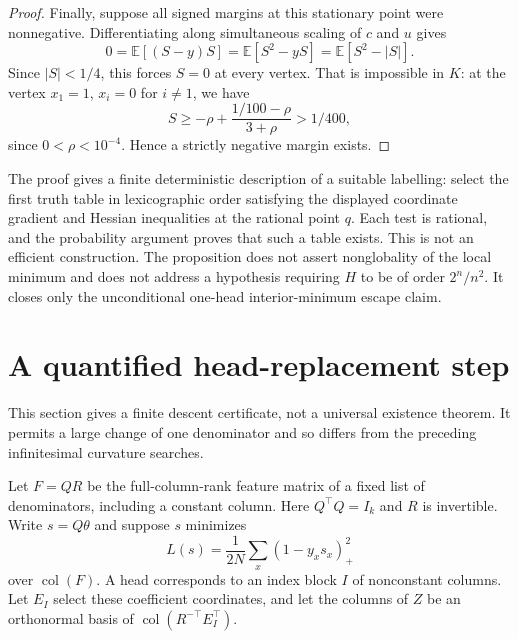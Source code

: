 \documentclass[11pt]{article}
\begin{document}
\begin{proof}
Finally, suppose all signed margins at this stationary point were
nonnegative. Differentiating along simultaneous scaling of $c$ and $u$
gives
\[
 0=\mathbb E[(S-y)S]=\mathbb E[S^2-yS]
   =\mathbb E[S^2-|S|].
\]
Since $|S|<1/4$, this forces $S=0$ at every vertex. That is impossible
in $K$: at the vertex $x_1=1$, $x_i=0$ for $i\ne1$, we have
\[
 S\ge-\rho+\frac{1/100-\rho}{3+\rho}>1/400,
\]
since $0<\rho<10^{-4}$. Hence a strictly negative margin exists.
\end{proof}

The proof gives a finite deterministic description of a suitable
labelling: select the first truth table in lexicographic order satisfying
the displayed coordinate gradient and Hessian inequalities at the
rational point $q$. Each test is rational, and the probability argument
proves that such a table exists. This is not an efficient construction.
The proposition does not assert nonglobality of the local minimum and
does not address a hypothesis requiring $H$ to be of order $2^n/n^2$.
It closes only the unconditional one-head interior-minimum escape claim.

\section{A quantified head-replacement step}

This section gives a finite descent certificate, not a universal existence
theorem. It permits a large change of one denominator and so differs from
the preceding infinitesimal curvature searches.

Let $F=QR$ be the full-column-rank feature matrix of a fixed list of
denominators, including a constant column. Here $Q^{\top}Q=I_k$ and
$R$ is invertible. Write $s=Q\theta$ and suppose $s$ minimizes
\[
 L(s)=\frac1{2N}\sum_x(1-y_xs_x)_+^2
\]
over $\operatorname{col}(F)$. A head corresponds to an index block
$I$ of nonconstant columns. Let $E_I$ select these coefficient coordinates,
and let the columns of $Z$ be an orthonormal basis of
$\operatorname{col}(R^{-\top}E_I^{\top})$.
\end{document}
